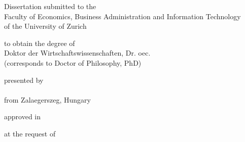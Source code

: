 \makeatletter
    \let\inserttitle\@title
    \let\insertauthor\@author
    \let\insertdate\@date
    \let\insertchairman\@chairman
    \let\insertcommittee\@committee
\makeatother

\begin{titlepage}
    \begin{doublespace}
    \begin{center}
        \vspace*{3cm}

        \begin{LARGE}
            \textbf{\inserttitle}
        \end{LARGE}

        \vfill

        \begin{large}
            Dissertation submitted to the\\Faculty of Economics, Business Administration and Information Technology\\of the University of Zurich
        \end{large}
 
        \vfill

        \begin{large}
            to obtain the degree of\\
            Doktor der Wirtschaftswissenschaften, Dr. oec.\\
            (corresponds to Doctor of Philosophy, PhD)
        \end{large}

        \vfill

        \begin{large}
            presented by\\
            \textbf{\insertauthor}\\
            from Zalaegerszeg, Hungary
        \end{large}

        \vfill

        \begin{large}
            approved in \monthyeardate\insertdate
        \end{large}

        \vfill

        \begin{large}
            at the request of\\\insertcommittee
        \end{large}

    \vspace*{1cm}

    \end{center}
    \end{doublespace}
\end{titlepage}